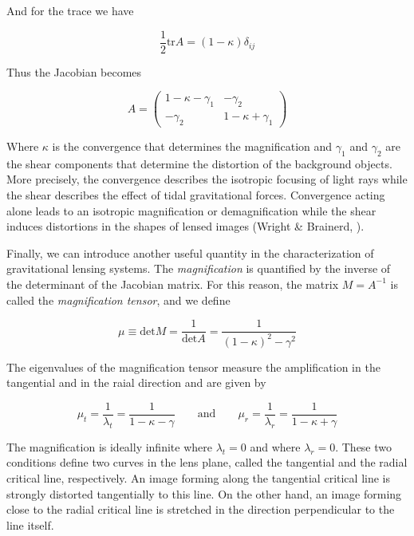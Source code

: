 And for the trace we have

\begin{equation}
\frac{1}{2}\text{tr}A=(1-\kappa)\delta_{ij}
\end{equation}

Thus the Jacobian becomes 

\begin{equation}
A= \left(\begin{array}{cc}
1-\kappa-\gamma_{1} & -\gamma_{2}\\
-\gamma_{2} & 1-\kappa+\gamma_{1}
\end{array}\right)
\end{equation}

Where $\kappa$ is the convergence that determines the magnification and $\gamma_{1}$ and $\gamma_{2}$ are the shear components that determine the distortion of the background objects. More precisely, the convergence describes the isotropic focusing of light rays while the shear describes the effect of tidal gravitational forces. Convergence acting alone leads to an isotropic magnification or demagnification while the shear induces distortions in the shapes of lensed images (Wright \& Brainerd, \citeyear{Reference4}). 

Finally, we can introduce another useful quantity in the characterization of gravitational lensing systems. The \textit{magnification} is quantified by the inverse of the determinant of the Jacobian matrix. For this reason, the matrix $M=A^{-1}$ is called the \textit{magnification tensor}, and we define

\begin{equation}
\mu \equiv \text{det} M = \frac{1}{\text{det}A}=\frac{1}{(1-\kappa)^2-\gamma^2}
\end{equation}

The eigenvalues of the magnification tensor measure the amplification in the tangential and in the raial direction and are given by

\begin{equation}
\mu_t = \frac{1}{\lambda_t}=\frac{1}{1-\kappa - \gamma} \qquad \text{and} \qquad  \mu_r = \frac{1}{\lambda_r}=\frac{1}{1-\kappa + \gamma}
\end{equation}

The magnification is ideally infinite where $\lambda_t=0$ and where $\lambda_r=0$. These two conditions define two curves in the lens plane, called the tangential and the radial critical line, respectively. An image forming along the tangential critical line is strongly distorted tangentially to this line. On the other hand, an image forming close to the radial critical line is stretched in the direction perpendicular to the line itself. 

